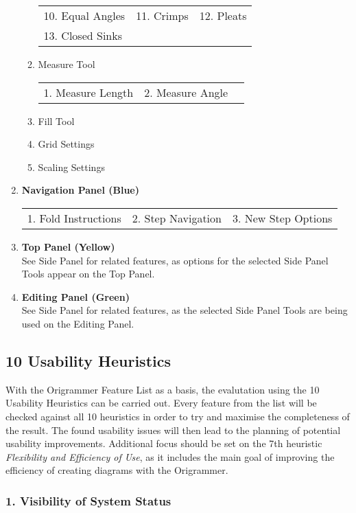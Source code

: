 \begin{enumerate}
\begin{enumerate}
\begin{tabular}{l l l}
        10. Equal Angles & 11. Crimps & 12. Pleats \\
        13. Closed Sinks
        \end{tabular}
        \item Measure Tool \\
        \begin{tabular}{l l l}
        1. Measure Length & 2. Measure Angle \\
        \end{tabular}
        \item Fill Tool
        \item Grid Settings
        \item Scaling Settings
    \end{enumerate}
\item \textbf{Navigation Panel (Blue)} \\
\begin{tabular}{l l l}
1. Fold Instructions & 2. Step Navigation & 3. New Step Options \\
\end{tabular}
\item \textbf{Top Panel (Yellow)} \\
See Side Panel for related features, as options for the selected Side Panel Tools appear on the Top Panel.
\item \textbf{Editing Panel (Green)} \\
See Side Panel for related features, as the selected Side Panel Tools are being used on the Editing Panel.
\end{enumerate}


\subsection{10 Usability Heuristics}
\label{sec:usabilityHeuristics}

With the Origrammer Feature List as a basis, the evalutation using the 10 Usability Heuristics can be carried out. Every feature from the list will be checked against all 10 heuristics in order to try and maximise the completeness of the result. The found usability issues will then lead to the planning of potential usability improvements. Additional focus should be set on the 7th heuristic \emph{Flexibility and Efficiency of Use}, as it includes the main goal of improving the efficiency of creating diagrams with the Origrammer.




\subsubsection*{1. Visibility of System Status}
\label{sec:visibility}

